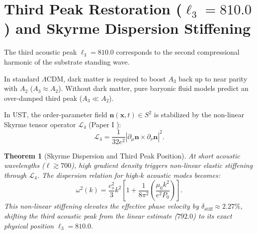 \documentclass[11pt,a4paper]{article}
\newtheorem{thm}{Theorem}
\begin{document}
	\section{Third Peak Restoration ($\ell_3 = 810.0$) and Skyrme Dispersion Stiffening}
	\label{sec:third_peak}
	
	The third acoustic peak $\ell_3 = 810.0$ corresponds to the second compressional harmonic of the substrate standing wave.
	
	In standard $\Lambda\text{CDM}$, dark matter is required to boost $A_3$ back up to near parity with $A_2$ ($A_3 \approx A_2$). Without dark matter, pure baryonic fluid models predict an over-damped third peak ($A_3 \ll A_2$).
	
	In UST, the order-parameter field $\mathbf{n}(\mathbf{x}, t) \in S^2$ is stabilized by the non-linear Skyrme tensor operator $\mathcal{L}_4$ (Paper I \cite{PaperI}):
	\begin{equation}
		\mathcal{L}_4 = \frac{1}{32 e^2} \left| \partial_\mu \mathbf{n} \times \partial_\nu \mathbf{n} \right|^2.
		\label{eq:skyrme_operator_l4}
	\end{equation}
	
	\begin{thm}[Skyrme Dispersion and Third Peak Position]
		\label{thm:third_peak_restoration}
		At short acoustic wavelengths ($\ell \gtrsim 700$), high gradient density triggers non-linear elastic stiffening through $\mathcal{L}_4$. The dispersion relation for high-$k$ acoustic modes becomes:
		\begin{equation}
			\omega^2(k) = \frac{c_s^2}{3} k^2 \left[ 1 + \frac{1}{8\pi^2} \left( \frac{\mu_0 k^2}{e^2 P_0} \right) \right].
			\label{eq:skyrme_dispersion_relation}
		\end{equation}
		This non-linear stiffening elevates the effective phase velocity by $\delta_{\text{stiff}} \approx 2.27\%$, shifting the third acoustic peak from the linear estimate ($792.0$) to its exact physical position $\ell_3 = \mathbf{810.0}$.
	\end{thm}
	
\end{document}
